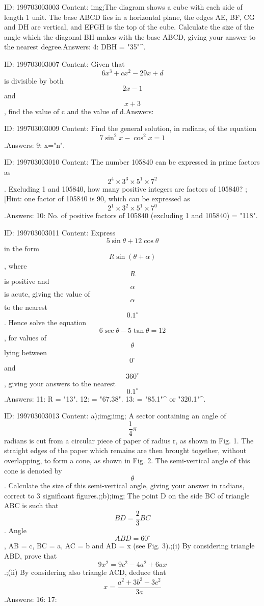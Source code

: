 \documentclass{article}
\begin{document}
ID: 199703003003
Content:
img;The diagram shows a cube with each side of length 1 unit. The base ABCD lies in a horizontal plane, the edges AE, BF, CG and DH are vertical, and EFGH is the top of the cube. Calculate the size of the angle which the diagonal BH makes with the base ABCD, giving your answer to the nearest degree.Answers:
4: \angle DBH = "35"^{\circ}.

ID: 199703003007
Content:
Given that \[6x^{3} + cx^{2} - 29x + d\] is divisible by both \[2x - 1\] and \[x + 3\], find the value of c and the value of d.Answers:

ID: 199703003009
Content:
Find the general solution, in radians, of the equation \[7\sin^{2}x - \cos^{2}x = 1\].Answers:
9: x="n\pi \pm {}\pi".

ID: 199703003010
Content:
The number 105840 can be expressed in prime factors as \[2^{4} \times 3^{3} \times 5^{1} \times 7^{2}\]. Excluding 1 and 105840, how many positive integers are factors of 105840? ;[Hint: one factor of 105840 is 90, which can be expressed as \[2^{1} \times 3^{2} \times 5^{1} \times 7^{0}\].Answers:
10: No. of positive factors of 105840 (excluding 1 and 105840) = "118".

ID: 199703003011
Content:
Express \[5\sin\theta + 12\cos\theta\] in the form \[R\sin(\theta + \alpha)\], where \[R\] is positive and \[\alpha\] is acute, giving the value of \[\alpha\] to the nearest \[0.1^\circ\]. Hence solve the equation \[6\sec\theta - 5\tan\theta = 12\], for values of \[\theta\] lying between \[0^\circ\] and \[360^\circ\], giving your answers to the nearest  \[0.1^\circ\].Answers:
11: R = "13".
12: \alpha = "67.38".
13: \theta = "85.1"^{\circ} or "320.1"^{\circ}.

ID: 199703003013
Content:
a);img;img; A sector containing an angle of \[\frac{1}{4}\pi\] radians is cut from a circular piece of paper of radius r, as shown in Fig. 1. The straight edges of the paper which remains are then brought together, without overlapping, to form a cone, as shown in Fig. 2. The semi-vertical angle of this cone is denoted by \[\theta\]. Calculate the size of this semi-vertical angle, giving your answer in radians, correct to 3 significant figures.;;b);img; The point D on the side BC of triangle ABC is such that \[BD = \frac{2}{3} BC\]. Angle \[ABD = 60^\circ\], AB = c, BC = a, AC = b and AD = x (see Fig. 3).;(i) By considering triangle ABD, prove that \[9x^{2} = 9c^{2} - 4a^{2} + 6ax\].;(ii) By considering also triangle ACD, deduce that \[x = \frac{a^{2} + 3b^{2} - 3c^{2}}{3a}\].Answers:
16: 
17: 
\end{document}
